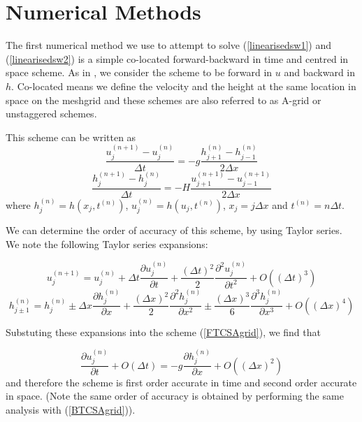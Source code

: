 \documentclass[a4paper,12pt, notitlepage]{article}
\begin{document}
\section{Numerical Methods}

The first numerical method we use to attempt to solve (\ref{linearisedsw1}) and (\ref{linearisedsw2}) is a simple co-located forward-backward in time and centred in space scheme. As in \cite{MPE textbook}, we consider the scheme to be forward in $u$ and backward in $h$. Co-located means we define the velocity and the height at the same location in space on the meshgrid and these schemes are also referred to as A-grid or unstaggered schemes.

This scheme can be written as 
\begin{equation} \label{FTCSAgrid}
\frac{u_{j}^{(n+1)} - u_{j}^{(n)}}{\Delta t} = -g \frac{h_{j+1}^{(n)} - h_{j-1}^{(n)}}{2\Delta x}
\end{equation}
\begin{equation}\label{BTCSAgrid}
\frac{h_{j}^{(n+1)} - h_{j}^{(n)}}{\Delta t} = -H \frac{u_{j+1}^{(n+1)} - u_{j-1}^{(n+1)}}{2\Delta x}
\end{equation}
where $h_{j}^{(n)} = h(x_{j}, t^{(n)})$, $u_{j}^{(n)} = h(u_{j}, t^{(n)})$, $x_{j} = j\Delta x$ and $t^{(n)} = n\Delta t$. 

We can determine the order of accuracy of this scheme, by using Taylor series. We note the following Taylor series expansions:

\begin{equation}\label{ujn+1}
u_{j}^{(n+ 1)} = u_{j}^{(n)} + \Delta t \frac{\partial u_{j}^{(n)}}{\partial t} + \frac{(\Delta t)^{2}}{2}\frac{\partial^{2} u_{j}^{(n)}}{\partial t^{2}} + O((\Delta t)^{3})
\end{equation}
\begin{equation}\label{hj+-1n}
h_{j \pm 1}^{(n)} = h_{j}^{(n)} \pm \Delta x  \frac{\partial h_{j}^{(n)}}{\partial x} + \frac{(\Delta x)^{2}}{2}\frac{\partial^{2} h_{j}^{(n)}}{\partial x^{2}} \pm \frac{(\Delta x)^{3}}{6}\frac{\partial^{3} h_{j}^{(n)}}{\partial x^{3}} + O((\Delta x)^{4})
\end{equation}

Substuting these expansions into the scheme (\ref{FTCSAgrid}), we find that 

\begin{equation}
\frac{\partial u_{j}^{(n)}}{\partial t} + O(\Delta t) =  -g \frac{\partial h_{j}^{(n)}}{\partial x} + O((\Delta x)^{2})
\end{equation} 
and therefore the scheme is first order accurate in time and second order accurate in space. (Note the same order of accuracy is obtained by performing the same analysis with (\ref{BTCSAgrid})).
\end{document}
